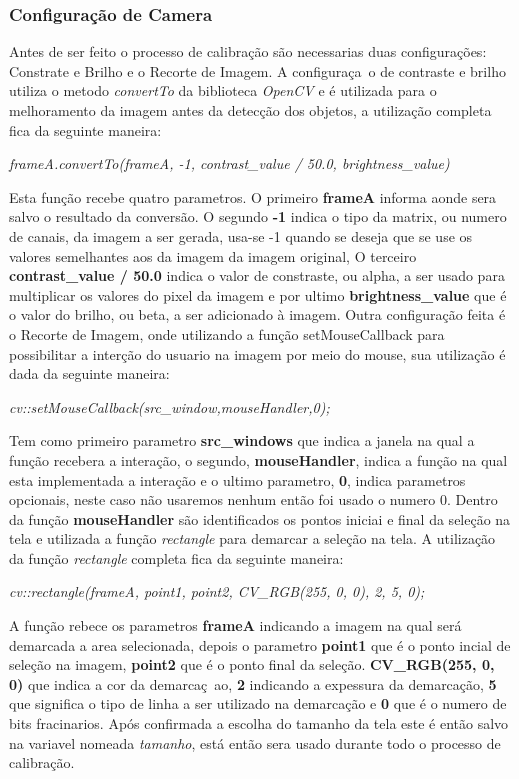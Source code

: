 	\subsubsection{Configuração de Camera}
Antes de ser feito o processo de calibração são necessarias duas configurações: Constrate e Brilho e o Recorte de Imagem.
A configuraça~o de contraste e brilho utiliza o metodo \textit{convertTo} da biblioteca \textit{OpenCV} e é utilizada para o melhoramento da imagem antes da detecção dos objetos, a utilização completa fica da seguinte maneira:
\begin{center}
\centering \textit{ frameA.convertTo(frameA, -1, contrast\_value / 50.0, brightness\_value)}
\end{center}
Esta função recebe quatro parametros. O primeiro \textbf{frameA} informa aonde sera salvo o resultado da conversão. O segundo \textbf{-1} indica o tipo da matrix, ou numero de canais, da imagem a ser gerada, usa-se -1 quando se deseja que se use os valores semelhantes aos da imagem da imagem original\cite{OpenCV}, O terceiro \textbf{contrast\_value / 50.0} indica o valor de constraste, ou alpha, a ser usado para multiplicar os valores do pixel da imagem\cite{OpenCV} e por ultimo \textbf{brightness\_value} que é o valor do brilho, ou beta, a ser adicionado à imagem. \newline
Outra configuração feita é o Recorte de Imagem, onde utilizando a função setMouseCallback para possibilitar a interção do usuario na imagem por meio do mouse, sua utilização é dada da seguinte maneira:
\begin{center}
\centering \textit{ cv::setMouseCallback(src\_window,mouseHandler,0);}
\end{center}
Tem como primeiro parametro \textbf{src\_windows} que indica a janela na qual a função recebera a interação,  o segundo, \textbf{mouseHandler}, indica a função na qual esta implementada a interação e o ultimo parametro, \textbf{0}, indica parametros opcionais, neste caso não usaremos nenhum então foi usado o numero 0.
Dentro da função \textbf{mouseHandler} são identificados os pontos iniciai e final da seleção na tela e utilizada a função \textit{rectangle} para demarcar a seleção na tela. A utilização da função \textit{rectangle} completa fica da seguinte maneira:
\begin{center}
\centering \textit{ cv::rectangle(frameA, point1, point2, CV\_RGB(255, 0, 0), 2, 5, 0);}
\end{center}
A função rebece os parametros \textbf{frameA} indicando a imagem na qual será demarcada a area selecionada, depois o parametro \textbf{point1} que é o ponto incial de seleção na imagem, \textbf{point2} que é o ponto final da seleção. \textbf{CV\_RGB(255, 0, 0)} que indica a cor da demarcaç~ao, \textbf{2} indicando a expessura da demarcação, \textbf{5} que significa o tipo de linha a ser utilizado na demarcação e \textbf{0} que é o numero de bits fracinarios.
 Após confirmada a escolha do tamanho da tela 
este é então salvo na variavel nomeada \textit{tamanho}, está então sera usado durante todo o processo de calibração.
\newpage
